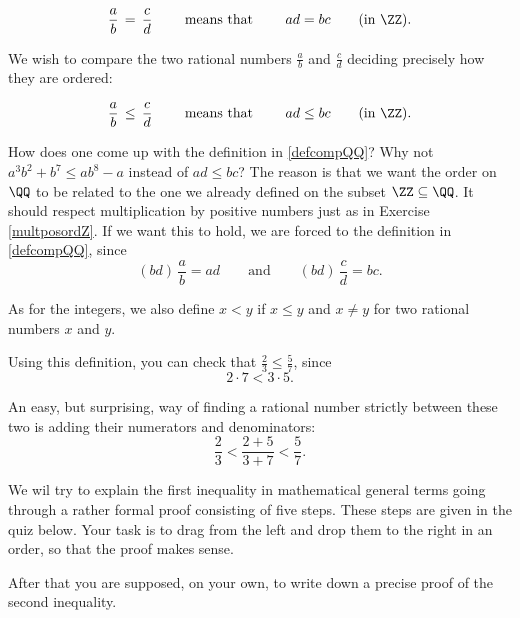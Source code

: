 \documentclass{article}
\begin{document}
\begin{equation*}[emph]
\frac{a}{b}\, =\, \frac{c}{d}\qquad \text{ means that }\qquad a d = b c\qquad (\text{in }\ZZ).
\end{equation*}


We wish to compare the two rational numbers $\frac{a}{b}$ and $\frac{c}{d}$ deciding
precisely how they are ordered:

\begin{equation}[emph]\label{defcompQQ}
\frac{a}{b}\, \leq\, \frac{c}{d}\qquad \text{ means that }\qquad a d \leq b c\qquad (\text{in }\ZZ).
\end{equation}


\begin{frameit}
\begin{remark}
  How does one come up with the definition in \eqref{defcompQQ}? Why not
  $a^3 b^2 + b^7 \leq a b^8 - a$ instead of $a d \leq b c$? The reason is that
  we want the order on $\QQ$ to be related to the one we already defined on
  the subset $\ZZ\subseteq \QQ$. It should respect multiplication by positive numbers just
  as in Exercise \ref{multposordZ}. If we want this to hold, we are forced
  to the definition in \eqref{defcompQQ}, since
  $$
  (b d)\,\frac{a}{b} = a d\qquad\text{and}\qquad (b d)\, \frac{c}{d} = b c.
  $$
\end{remark}
\end{frameit}


  


As for the integers, we also define $x < y$ if $x \leq y$ and $x\neq y$ for
two rational numbers $x$ and $y$.

Using this definition, you can check that $\frac{2}{3} \leq \frac{5}{7}$, since
$$
2\cdot 7 < 3 \cdot 5.
$$
 
An easy, but surprising, 
way of finding a rational number strictly between these two is
adding their numerators and denominators:
$$
\frac{2}{3} < \frac{2 + 5}{3 + 7} < \frac{5}{7}.
$$

We wil try to explain the first inequality in mathematical general terms going through a
rather formal proof consisting of five steps. These steps are
given in the quiz below. Your task is to drag from the left and drop them to the right in an order, 
so that the proof makes sense. 

After that you are supposed, on your own, to write down a precise proof of
the second inequality.
\end{document}
